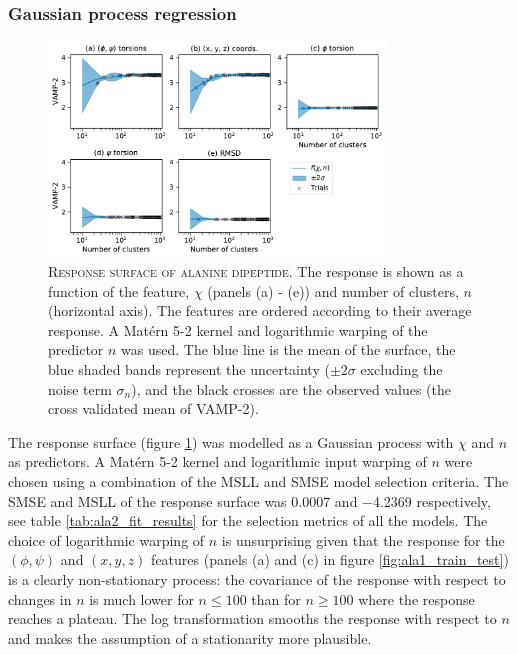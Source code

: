\subsubsection{Gaussian process regression}

\begin{figure}
    \centering
    \includegraphics[width=0.8\textwidth]{chapters/msm_optimization/figures/ala1_response_surface.pdf}
    \caption[Response surface of alanine dipeptide]{\textsc{Response surface of alanine dipeptide}. The response is shown as a function of the feature, $\chi$ (panels (a) - (e)) and number of clusters, $n$ (horizontal axis). The features are ordered according to their average response. A Mat\'{e}rn 5-2 kernel and logarithmic warping of the predictor $n$  was used. The blue line is the mean of the surface, the blue shaded bands represent the uncertainty ($\pm2\sigma$ excluding the noise term $\sigma_{n}$), and the black crosses are the observed values (the cross validated mean of VAMP-2).}
    \label{fig:ala1_response}
\end{figure}

The response surface (figure \ref{fig:ala1_response}) was modelled as a Gaussian process with $\chi$ and $n$ as predictors. A Mat\'{e}rn 5-2 kernel and logarithmic input warping of $n$ were chosen using a combination of the MSLL and SMSE model selection criteria. The SMSE and MSLL of the response surface was \num{0.0007} and  \num{-4.2369} respectively, see table \ref{tab:ala2_fit_results} for the selection metrics of all the models. The choice of logarithmic warping of $n$ is unsurprising given that the response for the $(\phi, \psi)$ and $(x,y,z)$ features (panels (a) and (c) in figure \ref{fig:ala1_train_test}) is a clearly non-stationary process: the covariance of the response with respect to changes in $n$ is much lower for $n\leq 100$ than for $n\geq 100$ where the response reaches a plateau. The log transformation smooths the response with respect to $n$ and makes the assumption of a stationarity more plausible.  

